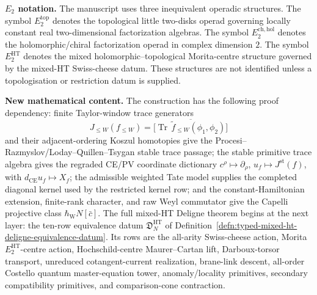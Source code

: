 \documentclass[11pt]{memoir}
\begin{document}
  \medskip\noindent
  \textbf{\texorpdfstring{\(E_2\)}{E2} notation.}
  The manuscript uses three inequivalent operadic structures.  The symbol
  \(E_2^{\mathrm{top}}\) denotes the topological little two-disks operad
  governing locally constant real two-dimensional factorization algebras.
  The symbol \(E_2^{\mathrm{ch,hol}}\) denotes the holomorphic/chiral
  factorization operad in complex dimension \(2\).  The symbol
  \(E_2^{\mathrm{HT}}\) denotes the mixed holomorphic--topological
  Morita-centre structure governed by the mixed-HT Swiss-cheese datum.
  These structures are not identified unless a topologisation or
  restriction datum is supplied.

  \medskip\noindent
  \textbf{New mathematical content.}
  The construction has the following proof dependency:
  finite Taylor-window trace generators
  \[
    J_{\leq W}(f_{\leq W})
    =
    \bigl[\overline{\operatorname{Tr}\,
    \tilde f_{\leq W}(\phi_1,\phi_2)}\bigr]
  \]
  and their adjacent-ordering Koszul homotopies give the
  Procesi--Razmyslov/Loday--Quillen--Tsygan stable trace passage; the
  stable primitive trace algebra gives the regraded CE/PV coordinate
  dictionary \(c^\rho\mapsto\partial_\rho\),
  \(u_f\mapsto J^{\mathrm{st}}(f)\), with
  \(d_{\mathrm{CE}}u_f\mapsto X_f\); the admissible
  weighted Tate model supplies the completed diagonal kernel used by the
  restricted kernel row; and the constant-Hamiltonian extension,
  finite-rank character, and raw Weyl commutator give the Capelli
  projective class \(\hbar_{\mathrm{W}}N[\bar c]\).  The full mixed-HT
  Deligne theorem begins at the next layer: the ten-row equivalence datum
  \(\mathfrak D^{\mathrm{HT}}_N\) of
  Definition~\ref{defn:typed-mixed-ht-deligne-equivalence-datum}.  Its rows
  are the all-arity Swiss-cheese action, Morita \(E_2^{\mathrm{HT}}\)-centre
  action, Hochschild-centre Maurer--Cartan lift, Darboux-torsor transport,
  unreduced cotangent-current realization, brane-link descent, all-order
  Costello quantum master-equation tower, anomaly/locality primitives,
  secondary compatibility primitives, and comparison-cone contraction.
\end{document}
